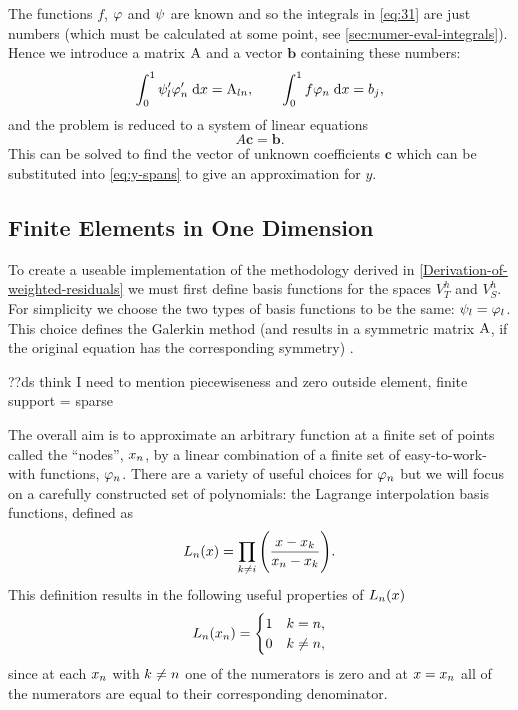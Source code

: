 The functions $f$, $\varphi$ and $\psi$ are known and so the integrals in \cref{eq:31} are just numbers (which must be calculated at some point, see \cref{sec:numer-eval-integrals}).
Hence we introduce a matrix $\mathrm{A}$ and a vector $\mathbf{b}$ containing these numbers:
\begin{equation}
  {\int_0^1  \psi_{l}'\varphi'_{n}  {\; \text{d}}{x}} =\mathrm{A}_{ln},\qquad{\int_0^1  f\varphi_{n}  {\; \text{d}}{x}} =b_{j},\label{eq:Aij_bj}
\end{equation}
and the problem is reduced to a system of linear equations
\begin{equation}
  A\mathbf{c} = \mathbf{b}.
  \label{eq:final_galerkin}
\end{equation}
This can be solved to find the vector of unknown coefficients $\mathbf{c}$ which can be substituted into \cref{eq:y-spans} to give an approximation for $y$.


\subsection{Finite Elements in One Dimension}
\label{sub:Actual-Finite-Elements}

To create a useable implementation of the methodology derived in \cref{Derivation-of-weighted-residuals} we must first define basis functions for the spaces $V_{T}^{h}$ and $V_S^h$.
For simplicity we choose the two types of basis functions to be the same: $\psi_l = \varphi_l$.
This choice defines the Galerkin method (and results in a symmetric matrix $\mathrm{A}$, if the original equation has the corresponding symmetry) \cite[215]{Zeinkiewicz1967}.

??ds think I need to mention piecewiseness and zero outside element, finite support = sparse

The overall aim is to approximate an arbitrary function at a finite set of points called the ``nodes'', $x_n$, by a linear combination of a finite set of easy-to-work-with functions, $\varphi_n$.
There are a variety of useful choices for $\varphi_n$ but we will focus on a carefully constructed set of polynomials: the Lagrange interpolation basis functions, defined as
\begin{equation}
  L_n(x)=\prod_{k\neq i}\Bigg(\dfrac{x-x_{k}}{x_n-x_{k}}\Bigg).
\end{equation}
This definition results in the following useful properties of $L_{n}(x)$
\begin{equation}
  \label{eq:35}
  L_{n}(x_{n}) =
  \begin{cases}
    1 & k = n, \\
    0 & k \neq n,
  \end{cases}
\end{equation}
since at each $x_{n}$ with $k \neq n$ one of the numerators is zero and at
$x = x_{n}$ all of the numerators are equal to their corresponding denominator.

